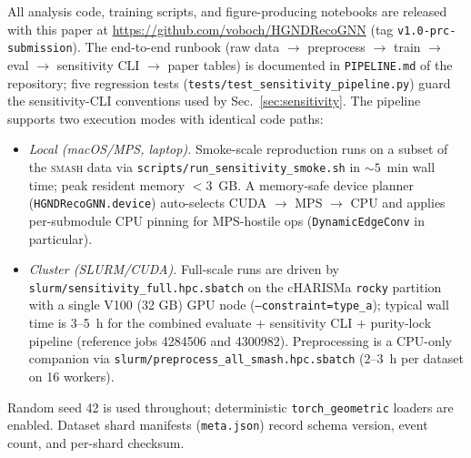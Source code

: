 \documentclass[aps,prc,twocolumn,superscriptaddress,showpacs,%
               nofootinbib,floatfix,longbibliography]{revtex4-2}
\newcommand{\SMASH}{\textsc{smash}}
\begin{document}
All analysis code, training scripts, and figure-producing notebooks
are released with this paper at
\url{https://github.com/voboch/HGNDRecoGNN} (tag
\texttt{v1.0-prc-submission}).
The end-to-end runbook (raw data $\to$ preprocess $\to$ train $\to$
eval $\to$ sensitivity CLI $\to$ paper tables) is documented in
\texttt{PIPELINE.md} of the repository; five regression tests
(\texttt{tests/test\_sensitivity\_pipeline.py}) guard the
sensitivity-CLI conventions used by
Sec.~\ref{sec:sensitivity}.
The pipeline supports two execution modes with identical code paths:
\begin{itemize}
  \item \emph{Local (macOS/MPS, laptop).}
    Smoke-scale reproduction runs on a subset of the \SMASH{} data
    via \texttt{scripts/run\_sensitivity\_smoke.sh} in
    $\sim 5$~min wall time; peak resident memory
    $< 3$~GB.  A memory-safe device planner
    (\texttt{HGNDRecoGNN.device}) auto-selects CUDA $\to$ MPS $\to$
    CPU and applies per-submodule CPU pinning for MPS-hostile
    ops (\texttt{DynamicEdgeConv} in particular).
  \item \emph{Cluster (SLURM/CUDA).}
    Full-scale runs are driven by
    \texttt{slurm/sensitivity\_full.hpc.sbatch} on the cHARISMa
    \texttt{rocky} partition with a single V100 (32 GB) GPU node
    (\texttt{--constraint=type\_a}); typical wall time is 3--5~h
    for the combined evaluate + sensitivity CLI + purity-lock
    pipeline (reference jobs 4284506 and 4300982).  Preprocessing
    is a CPU-only companion via
    \texttt{slurm/preprocess\_all\_smash.hpc.sbatch} (2--3~h per
    dataset on 16 workers).
\end{itemize}
Random seed 42 is used throughout; deterministic
\texttt{torch\_geometric} loaders are enabled.  Dataset shard
manifests (\texttt{meta.json}) record schema version, event count,
and per-shard checksum.
\end{document}
